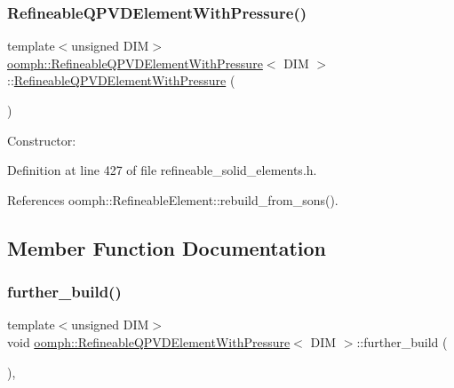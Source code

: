 \subsubsection{\texorpdfstring{Refineable\+Q\+P\+V\+D\+Element\+With\+Pressure()}{RefineableQPVDElementWithPressure()}}
{\footnotesize\ttfamily template$<$unsigned D\+IM$>$ \\
\hyperlink{classoomph_1_1RefineableQPVDElementWithPressure}{oomph\+::\+Refineable\+Q\+P\+V\+D\+Element\+With\+Pressure}$<$ D\+IM $>$\+::\hyperlink{classoomph_1_1RefineableQPVDElementWithPressure}{Refineable\+Q\+P\+V\+D\+Element\+With\+Pressure} (\begin{DoxyParamCaption}{ }\end{DoxyParamCaption})\hspace{0.3cm}{\ttfamily [inline]}}



Constructor\+: 



Definition at line 427 of file refineable\+\_\+solid\+\_\+elements.\+h.



References oomph\+::\+Refineable\+Element\+::rebuild\+\_\+from\+\_\+sons().



\subsection{Member Function Documentation}
\mbox{\label{classoomph_1_1RefineableQPVDElementWithPressure_af2981a672382c6db25389aa7c82a6b30}} 
\subsubsection{\texorpdfstring{further\+\_\+build()}{further\_build()}\hspace{0.1cm}{\footnotesize\ttfamily [1/3]}}
{\footnotesize\ttfamily template$<$unsigned D\+IM$>$ \\
void \hyperlink{classoomph_1_1RefineableQPVDElementWithPressure}{oomph\+::\+Refineable\+Q\+P\+V\+D\+Element\+With\+Pressure}$<$ D\+IM $>$\+::further\+\_\+build (\begin{DoxyParamCaption}{ }\end{DoxyParamCaption})\hspace{0.3cm}{\ttfamily [inline]}, {\ttfamily [virtual]}}



